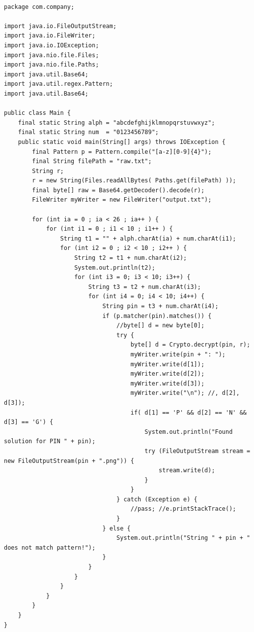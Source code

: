 \documentclass[english,a4paper,nols,noindent]{tufte-handout}
\begin{document}
\begin{verbatim}

package com.company;

import java.io.FileOutputStream;
import java.io.FileWriter;
import java.io.IOException;
import java.nio.file.Files;
import java.nio.file.Paths;
import java.util.Base64;
import java.util.regex.Pattern;
import java.util.Base64;

public class Main {
    final static String alph = "abcdefghijklmnopqrstuvwxyz";
    final static String num  = "0123456789";
    public static void main(String[] args) throws IOException {
        final Pattern p = Pattern.compile("[a-z][0-9]{4}");
        final String filePath = "raw.txt";
        String r;
        r = new String(Files.readAllBytes( Paths.get(filePath) ));
        final byte[] raw = Base64.getDecoder().decode(r);
        FileWriter myWriter = new FileWriter("output.txt");

        for (int ia = 0 ; ia < 26 ; ia++ ) {
            for (int i1 = 0 ; i1 < 10 ; i1++ ) {
                String t1 = "" + alph.charAt(ia) + num.charAt(i1);
                for (int i2 = 0 ; i2 < 10 ; i2++ ) {
                    String t2 = t1 + num.charAt(i2);
                    System.out.println(t2);
                    for (int i3 = 0; i3 < 10; i3++) {
                        String t3 = t2 + num.charAt(i3);
                        for (int i4 = 0; i4 < 10; i4++) {
                            String pin = t3 + num.charAt(i4);
                            if (p.matcher(pin).matches()) {
                                //byte[] d = new byte[0];
                                try {
                                    byte[] d = Crypto.decrypt(pin, r);
                                    myWriter.write(pin + ": ");
                                    myWriter.write(d[1]);
                                    myWriter.write(d[2]);
                                    myWriter.write(d[3]);
                                    myWriter.write("\n"); //, d[2], d[3]);
                                    if( d[1] == 'P' && d[2] == 'N' && d[3] == 'G') {
                                        System.out.println("Found solution for PIN " + pin);
                                        try (FileOutputStream stream = new FileOutputStream(pin + ".png")) {
                                            stream.write(d);
                                        }
                                    }
                                } catch (Exception e) {
                                    //pass; //e.printStackTrace();
                                }
                            } else {
                                System.out.println("String " + pin + " does not match pattern!");
                            }
                        }
                    }
                }
            }
        }
    }
}
\end{verbatim}
\end{document}

